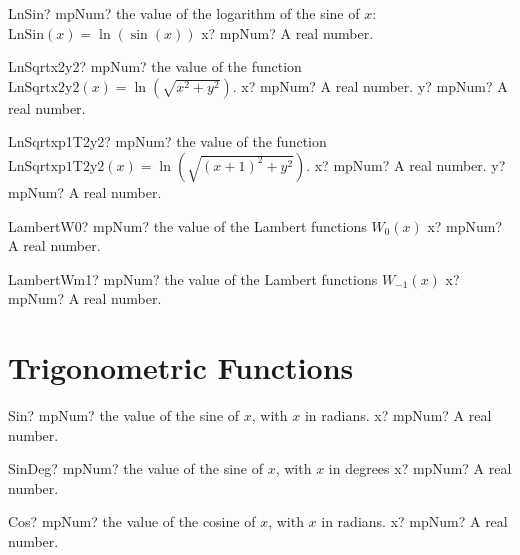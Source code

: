 \documentclass[12pt,a4paper,openany]{book}
\begin{document}
\begin{mpFunctionsExtract}
\mpFunctionOne
{LnSin? mpNum? the value of the logarithm of the sine of $x$: $\text{LnSin}(x) =\ln(\sin(x))$}
{x? mpNum? A real number.}
\end{mpFunctionsExtract}

\begin{mpFunctionsExtract}
\mpFunctionTwo
{LnSqrtx2y2? mpNum? the value of the function $\text{LnSqrtx2y2}(x) =\ln \left(\sqrt{x^2+y^2} \right)$.}
{x? mpNum? A real number.}
{y? mpNum? A real number.}
\end{mpFunctionsExtract}

\begin{mpFunctionsExtract}
\mpFunctionTwo
{LnSqrtxp1T2y2? mpNum? the value of the function $\text{LnSqrtxp1T2y2}(x) =\ln \left(\sqrt{(x+1)^2+y^2} \right)$.}
{x? mpNum? A real number.}
{y? mpNum? A real number.}
\end{mpFunctionsExtract}

\begin{mpFunctionsExtract}
\mpFunctionOne
{LambertW0? mpNum? the value of the Lambert functions $W_0(x)$}
{x? mpNum? A real number.}
\end{mpFunctionsExtract}

\begin{mpFunctionsExtract}
\mpFunctionOne
{LambertWm1? mpNum? the value of the Lambert functions $W_{-1}(x)$}
{x? mpNum? A real number.}
\end{mpFunctionsExtract}

\section{Trigonometric Functions}

\begin{mpFunctionsExtract}
\mpFunctionOne
{Sin? mpNum? the value of the sine of $x$, with $x$ in radians.}
{x? mpNum? A real number.}
\end{mpFunctionsExtract}

\begin{mpFunctionsExtract}
\mpFunctionOne
{SinDeg? mpNum? the value of the sine of $x$, with $x$ in degrees}
{x? mpNum? A real number.}
\end{mpFunctionsExtract}

\begin{mpFunctionsExtract}
\mpFunctionOne
{Cos? mpNum? the value of the cosine of $x$, with $x$ in radians.}
{x? mpNum? A real number.}
\end{mpFunctionsExtract}
\end{document}
